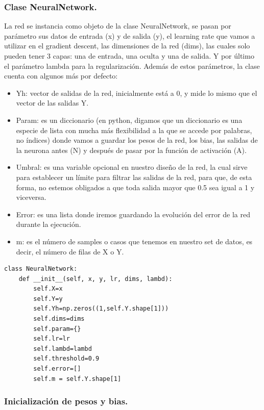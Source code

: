 \documentclass[a4paper,10pt]{article}
\begin{document}
\subsubsection{Clase NeuralNetwork.}

La red se instancia como objeto de la clase NeuralNetwork, se pasan por parámetro sus datos de entrada (x) y de salida (y), el learning rate que vamos a utilizar en el gradient descent, las dimensiones de la red (dims), las cuales solo pueden tener 3 capas: una de entrada, una oculta y una de salida. Y por último el parámetro lambda para la regularización. Además de estos parámetros, la clase cuenta con algunos más por defecto:
\begin{itemize}
    \item Yh: vector de salidas de la red, inicialmente está a 0, y mide lo mismo que el vector de las salidas Y.
    \item Param: es un diccionario (en python, digamos que un diccionario es una especie de lista con mucha más flexibilidad a la que se accede por palabras, no índices) donde vamos a guardar los pesos de la red, los bias, las salidas de la neurona antes (N) y después de pasar por la función de activación (A).
    \item Umbral: es una variable opcional en nuestro diseño de la red, la cual sirve para establecer un límite para filtrar las salidas de la red, para que, de esta forma, no estemos obligados a que toda salida mayor que 0.5 sea igual a 1 y viceversa.
    \item Error: es una lista donde iremos guardando la evolución del error de la red durante la ejecución.
    \item m: es el número de samples o casos que tenemos en nuestro set de datos, es decir, el número de filas de X o Y.
\end{itemize}
\begin{lstlisting}
class NeuralNetwork:
    def __init__(self, x, y, lr, dims, lambd):
        self.X=x
        self.Y=y
        self.Yh=np.zeros((1,self.Y.shape[1]))
        self.dims=dims
        self.param={}
        self.lr=lr
        self.lambd=lambd
        self.threshold=0.9
        self.error=[]
        self.m = self.Y.shape[1]
\end{lstlisting}
\subsubsection{Inicialización de pesos y bias.}
\end{document}
